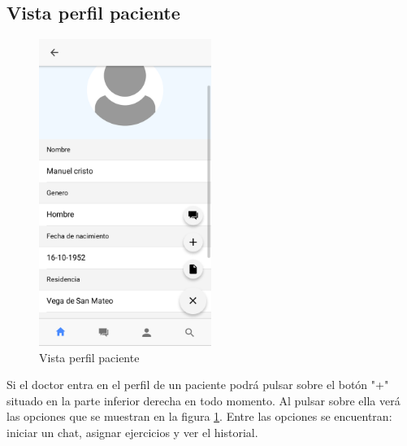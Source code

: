 \subsection{Vista perfil paciente}
\begin{figure}[!h]
    \centering
    \includegraphics[width=0.5\textwidth]{images/screenshots/doctor-patient-profile.png}
    \caption{Vista perfil paciente}
    \label{doctor-patient-profile}
\end{figure}

Si el doctor entra en el perfil de un paciente podrá pulsar sobre el botón "+"
situado en la parte inferior derecha en todo momento. Al pulsar sobre ella verá
las opciones que se muestran en la figura \ref{doctor-patient-profile}. Entre las
opciones se encuentran: iniciar un chat, asignar ejercicios y ver el historial.
\clearpage


